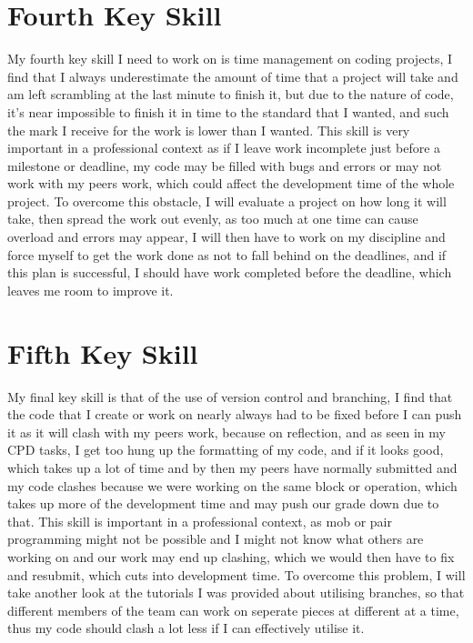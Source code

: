 \documentclass{scrartcl}
\begin{document}
\section{Fourth Key Skill}

My fourth key skill I need to work on is time management on coding projects, I find that I always underestimate the amount of time that a project will take and am left scrambling at the last minute to finish it, but due to the nature of code, it's near impossible to finish it in time to the standard that I wanted, and such the mark I receive for the work is lower than I wanted. This skill is very important in a professional context as if I leave work incomplete just before a milestone or deadline, my code may be filled with bugs and errors or may not work with my peers work, which could affect the development time of the whole project. To overcome this obstacle, I will evaluate a project on how long it will take, then spread the work out evenly, as too much at one time can cause overload and errors may appear, I will then have to work on my discipline and force myself to get the work done as not to fall behind on the deadlines, and if this plan is successful, I should have work completed before the deadline, which leaves me room to improve it. 



\section{Fifth Key Skill}

My final key skill is that of the use of version control and branching, I find that the code that I create or work on nearly always had to be fixed before I can push it as it will clash with my peers work, because on reflection, and as seen in my CPD tasks, I get too hung up the formatting of my code, and if it looks good, which takes up a lot of time and by then my peers have normally submitted and my code clashes because we were working on the same block or operation, which takes up more of the development time and may push our grade down due to that. This skill is important in a professional context, as mob or pair programming might not be possible and I might not know what others are working on and our work may end up clashing, which we would then have to fix and resubmit, which cuts into development time. To overcome this problem, I will take another look at the tutorials I was provided about utilising branches, so that different members of the team can work on seperate pieces at different at a time, thus my code should clash a lot less if I can effectively utilise it. 
\end{document}
